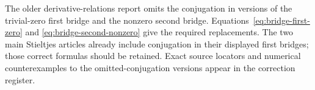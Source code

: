 \begin{remark}
The older derivative-relations report omits the conjugation
in versions of the trivial-zero first bridge and the nonzero
second bridge. Equations~\eqref{eq:bridge-first-zero} and
\eqref{eq:bridge-second-nonzero} give the required replacements.
The two main Stieltjes articles already include conjugation
in their displayed first bridges; those correct formulas
should be retained. Exact source locators and numerical
counterexamples to the omitted-conjugation versions appear
in the correction register.
\end{remark}
